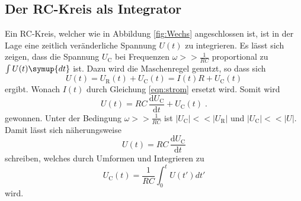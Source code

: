 \subsection{Der RC-Kreis als Integrator}
Ein RC-Kreis, welcher wie in Abbildung \ref{fig:Wechs} angeschlossen ist, ist in der Lage eine zeitlich veränderliche Spannung $U(t)$ zu integrieren.
Es lässt sich zeigen, dass die Spannung $U_\text{C}$ bei Frequenzen $\omega >> \frac{1}{RC}$ proportional zu $\int U(t) \symup{dt}$ ist.
Dazu wird die Maschenregel genutzt, so dass sich
\begin{equation}
    U(t)=U_\text{R}(t)+U_\text{C}(t) =I(t)R +U_\text{C}(t)
\end{equation}
ergibt.
Wonach $I(t)$ durch Gleichung \eqref{eqn:strom} ersetzt wird. Somit wird
\begin{equation*}
    U(t)=RC\, \frac{\text{d}U_\text{C}}{\text{d}t} + U_\text{C}(t) \; \text{.}
\end{equation*}
gewonnen.
Unter der Bedingung $\omega >> \frac{1}{RC}$ ist $|U_\text{C}| << |U_\text{R}|$ und $|U_\text{C}| << |U|$. 
Damit lässt sich näherungsweise 
\begin{equation*}
    U(t)=RC \, \frac{\text{d}U_\text{C}}{\text{d}t}
\end{equation*}
schreiben, welches durch Umformen und Integrieren zu
\begin{equation}
    U_\text{C}(t)=\frac{1}{RC} \int_0^t U(t') dt'
\end{equation}
wird.